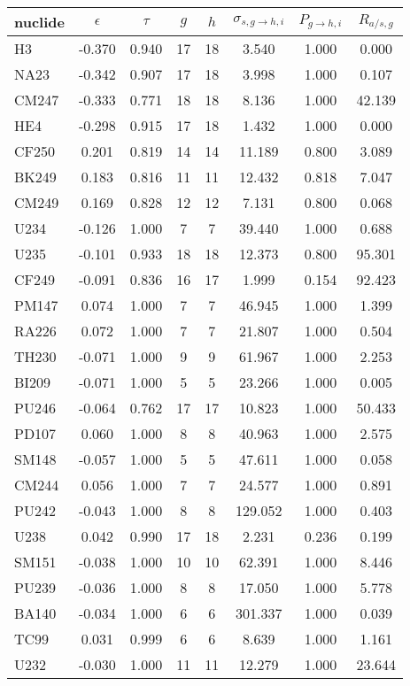\begin{tabular}{|l|ccccccc|}
\hline
nuclide & $\epsilon$ & $\tau$ & $g$ & $h$ & $\sigma_{s,g\to h,i}$ & $P_{g\to h,i}$ & $R_{a/s,g}$\\
\hline
H3 & -0.370 & 0.940 & 17 & 18 & 3.540 & 1.000 & 0.000\\
NA23 & -0.342 & 0.907 & 17 & 18 & 3.998 & 1.000 & 0.107\\
CM247 & -0.333 & 0.771 & 18 & 18 & 8.136 & 1.000 & 42.139\\
HE4 & -0.298 & 0.915 & 17 & 18 & 1.432 & 1.000 & 0.000\\
CF250 & 0.201 & 0.819 & 14 & 14 & 11.189 & 0.800 & 3.089\\
BK249 & 0.183 & 0.816 & 11 & 11 & 12.432 & 0.818 & 7.047\\
CM249 & 0.169 & 0.828 & 12 & 12 & 7.131 & 0.800 & 0.068\\
U234 & -0.126 & 1.000 & 7 & 7 & 39.440 & 1.000 & 0.688\\
U235 & -0.101 & 0.933 & 18 & 18 & 12.373 & 0.800 & 95.301\\
CF249 & -0.091 & 0.836 & 16 & 17 & 1.999 & 0.154 & 92.423\\
PM147 & 0.074 & 1.000 & 7 & 7 & 46.945 & 1.000 & 1.399\\
RA226 & 0.072 & 1.000 & 7 & 7 & 21.807 & 1.000 & 0.504\\
TH230 & -0.071 & 1.000 & 9 & 9 & 61.967 & 1.000 & 2.253\\
BI209 & -0.071 & 1.000 & 5 & 5 & 23.266 & 1.000 & 0.005\\
PU246 & -0.064 & 0.762 & 17 & 17 & 10.823 & 1.000 & 50.433\\
PD107 & 0.060 & 1.000 & 8 & 8 & 40.963 & 1.000 & 2.575\\
SM148 & -0.057 & 1.000 & 5 & 5 & 47.611 & 1.000 & 0.058\\
CM244 & 0.056 & 1.000 & 7 & 7 & 24.577 & 1.000 & 0.891\\
PU242 & -0.043 & 1.000 & 8 & 8 & 129.052 & 1.000 & 0.403\\
U238 & 0.042 & 0.990 & 17 & 18 & 2.231 & 0.236 & 0.199\\
SM151 & -0.038 & 1.000 & 10 & 10 & 62.391 & 1.000 & 8.446\\
PU239 & -0.036 & 1.000 & 8 & 8 & 17.050 & 1.000 & 5.778\\
BA140 & -0.034 & 1.000 & 6 & 6 & 301.337 & 1.000 & 0.039\\
TC99 & 0.031 & 0.999 & 6 & 6 & 8.639 & 1.000 & 1.161\\
U232 & -0.030 & 1.000 & 11 & 11 & 12.279 & 1.000 & 23.644\\

\end{tabular}
